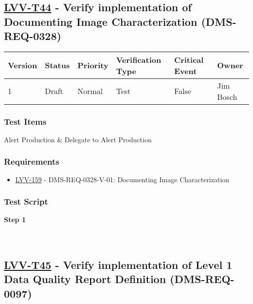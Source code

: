 \hypertarget{lvv-t44---verify-implementation-of-documenting-image-characterization-dms-req-0328}{%
\subsection{\texorpdfstring{\href{https://jira.lsstcorp.org/secure/Tests.jspa\#/testCase/LVV-T44}{LVV-T44}
- Verify implementation of Documenting Image Characterization
(DMS-REQ-0328)}{LVV-T44 - Verify implementation of Documenting Image Characterization (DMS-REQ-0328)}}\label{lvv-t44---verify-implementation-of-documenting-image-characterization-dms-req-0328}}

\begin{longtable}[]{@{}llllll@{}}
\toprule
Version & Status & Priority & Verification Type & Critical Event &
Owner\tabularnewline
\midrule
\endhead
1 & Draft & Normal & Test & False & Jim Bosch\tabularnewline
\bottomrule
\end{longtable}

\hypertarget{test-items-133}{%
\subsubsection{Test Items}\label{test-items-133}}

Alert Production \& Delegate to Alert Production

\hypertarget{requirements-134}{%
\subsubsection{Requirements}\label{requirements-134}}

\begin{itemize}
\tightlist
\item
  \href{https://jira.lsstcorp.org/browse/LVV-159}{LVV-159} -
  DMS-REQ-0328-V-01: Documenting Image Characterization
\end{itemize}

\hypertarget{test-script-134}{%
\subsubsection{Test Script}\label{test-script-134}}

\textbf{Step 1}\\
~\\
~\\

\hypertarget{lvv-t45---verify-implementation-of-level-1-data-quality-report-definition-dms-req-0097}{%
\subsection{\texorpdfstring{\href{https://jira.lsstcorp.org/secure/Tests.jspa\#/testCase/LVV-T45}{LVV-T45}
- Verify implementation of Level 1 Data Quality Report Definition
(DMS-REQ-0097)}{LVV-T45 - Verify implementation of Level 1 Data Quality Report Definition (DMS-REQ-0097)}}\label{lvv-t45---verify-implementation-of-level-1-data-quality-report-definition-dms-req-0097}}

